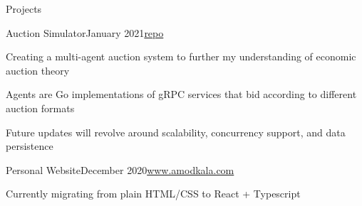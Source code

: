 \documentclass{resume} %
\begin{document}
	\begin{rSection}{Projects}
	
	    \begin{rSubsection}{Auction Simulator}{January 2021}{\href{https://www.github.com/amodkala/auction}{repo}}{}
			\item Creating a multi-agent auction system to further my understanding of economic auction theory
			\item Agents are Go implementations of gRPC services that bid according to different auction formats
			\item Future updates will revolve around scalability, concurrency support, and data persistence
		\end{rSubsection}
	
	   \begin{rSubsection}{Personal Website}{December 2020}{\href{https://www.amodkala.com}{www.amodkala.com}}{}
			\item Currently migrating from plain HTML/CSS to React + Typescript
		\end{rSubsection}   
		
	\end{rSection}
\end{document}
